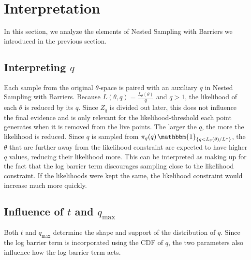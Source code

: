 \documentclass[12pt, a4paper]{report}
\begin{document}
\section{Interpretation}
In this section, we analyze the elements of Nested Sampling with Barriers we introduced in the previous section.

\subsection{Interpreting $q$}
Each sample from the original $\theta$-space is paired with an auxiliary $q$ in Nested Sampling with Barriers.
Because $L(\theta, q) = \frac{L_\theta(\theta)}{q}$ and $q > 1$, the likelihood of each $\theta$ is reduced by its $q$.
Since $Z_q$ is divided out later, this does not influence the final evidence and is only relevant for the likelihood-threshold each point generates when it is removed from the live points.
The larger the $q$, the more the likelihood is reduced.
Since $q$ is sampled from $\pi_q(q) \, \mathbbm{1}_{\{q < L_\theta(\theta) / L^*\}}$, the $\theta$ that are further away from the likelihood constraint are expected to have higher $q$ values, reducing their likelihood more.
This can be interpreted as making up for the fact that the log barrier term discourages sampling close to the likelihood constraint.
If the likelihoods were kept the same, the likelihood constraint would increase much more quickly.

\subsection{Influence of $t$ and $q_{\textrm{max}}$}
Both $t$ and $q_{\textrm{max}}$ determine the shape and support of the distribution of $q$.
Since the log barrier term is incorporated using the CDF of $q$, the two parameters also influence how the log barrier term acts.
\end{document}
